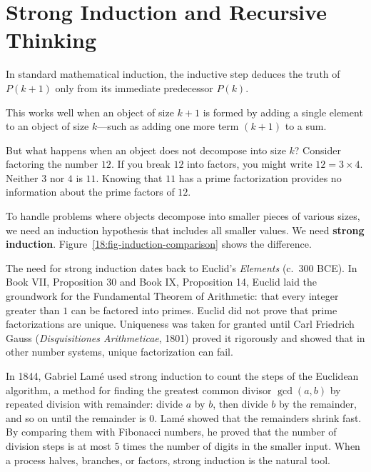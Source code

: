 \section{Strong Induction and Recursive Thinking}
\chapterline

In standard mathematical induction, the inductive step deduces the truth of $P(k+1)$ only from its immediate predecessor $P(k)$.

This works well when an object of size $k+1$ is formed by adding a single element to an object of size $k$---such as adding one more term $(k+1)$ to a sum.

But what happens when an object does not decompose into size $k$? 
Consider factoring the number $12$. If you break $12$ into factors, you might write $12 = 3 \times 4$. Neither $3$ nor $4$ is $11$. Knowing that $11$ has a prime factorization provides no information about the prime factors of $12$. 

To handle problems where objects decompose into smaller pieces of various sizes, we need an induction hypothesis that includes all smaller values. We need \textbf{strong induction}. Figure~\ref{18:fig-induction-comparison} shows the difference.

\begin{historybox}
The need for strong induction dates back to Euclid's \emph{Elements} (c.~300 BCE). In Book VII, Proposition 30 and Book IX, Proposition 14, Euclid laid the groundwork for the Fundamental Theorem of Arithmetic: that every integer greater than $1$ can be factored into primes. Euclid did not prove that prime factorizations are unique. Uniqueness was taken for granted until Carl Friedrich Gauss (\emph{Disquisitiones Arithmeticae}, 1801) proved it rigorously and showed that in other number systems, unique factorization can fail.

In 1844, Gabriel Lam\'e used strong induction to count the steps of the Euclidean algorithm, a method for finding the greatest common divisor $\gcd(a, b)$ by repeated division with remainder: divide $a$ by $b$, then divide $b$ by the remainder, and so on until the remainder is $0$. Lam\'e showed that the remainders shrink fast. By comparing them with Fibonacci numbers, he proved that the number of division steps is at most $5$ times the number of digits in the smaller input. When a process halves, branches, or factors, strong induction is the natural tool.
\end{historybox}

